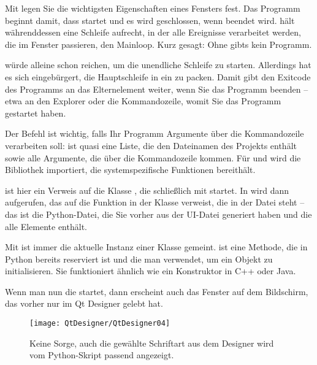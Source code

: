 \medskip

Mit  legen Sie die wichtigsten Eigenschaften eines Fensters fest. Das Programm beginnt damit, dass  startet und es wird geschlossen, wenn  beendet wird.  hält währenddessen eine Schleife aufrecht, in der alle Ereignisse verarbeitet werden, die im Fenster passieren, den Mainloop. Kurz gesagt: Ohne  gibts kein Programm.

 würde alleine schon reichen, um die unendliche Schleife zu starten. Allerdings hat es sich eingebürgert, die Hauptschleife in ein  zu packen. Damit gibt  den Exitcode des Programms an das Elternelement weiter, wenn Sie das Programm beenden -- etwa an den Explorer oder die Kommandozeile, womit Sie das Programm gestartet haben.

Der Befehl  ist wichtig, falls Ihr Programm Argumente über die Kommandozeile verarbeiten soll:  ist quasi eine Liste, die den Dateinamen des Projekts enthält sowie alle Argumente, die über die Kommandozeile kommen. Für  und  wird die Bibliothek  importiert, die systemspezifische Funktionen bereithält.

 ist hier ein Verweis auf die Klasse , die schließlich mit  startet. In  wird dann  aufgerufen, das auf die Funktion  in der Klasse  verweist, die in der Datei  steht -- das ist die Python-Datei, die Sie vorher aus der UI-Datei generiert haben und die alle Elemente enthält.

Mit  ist immer die aktuelle Instanz einer Klasse gemeint.  ist eine Methode, die in Python bereits reserviert ist und die man verwendet, um ein Objekt zu initialisieren. Sie funktioniert ähnlich wie ein Konstruktor in C++ oder Java.

Wenn man nun die  startet, dann erscheint auch das Fenster auf dem Bildschirm, das vorher nur im Qt Designer gelebt hat.



\begin{figure}
  \begin{center}
    \texttt{[image: QtDesigner/QtDesigner04]}
     \caption{Keine Sorge, auch die gewählte Schriftart aus dem Designer wird vom Python-Skript passend angezeigt.}
  \end{center}
\end{figure}




